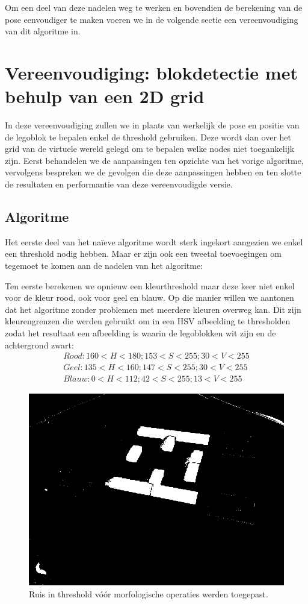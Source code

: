 Om een deel van deze nadelen weg te werken en bovendien de berekening van de pose eenvoudiger te maken voeren we in de volgende sectie een vereenvoudiging van dit algoritme in.
 
\section{Vereenvoudiging: blokdetectie met behulp van een 2D grid} \label{sec:naive_vereenv}
In deze vereenvoudiging zullen we in plaats van werkelijk de pose en positie van de legoblok te bepalen enkel de threshold gebruiken. Deze wordt dan over het grid van de virtuele wereld gelegd om te bepalen welke nodes niet toegankelijk zijn. Eerst behandelen we de aanpassingen ten opzichte van het vorige algoritme, vervolgens bespreken we de gevolgen die deze aanpassingen hebben en ten slotte de resultaten en performantie van deze vereenvoudigde versie.

\subsection{Algoritme}
Het eerste deel van het na\"ieve algoritme wordt sterk ingekort aangezien we enkel een threshold nodig hebben. Maar er zijn ook een tweetal toevoegingen om tegemoet te komen aan de nadelen van het algoritme:

Ten eerste berekenen we opnieuw een kleurthreshold maar deze keer niet enkel voor de kleur rood, ook voor geel en blauw. Op die manier  willen we aantonen dat het algoritme zonder problemen met meerdere kleuren overweg kan. Dit zijn kleurengrenzen die werden gebruikt om in een HSV afbeelding te thresholden zodat het resultaat een afbeelding is waarin de legoblokken wit zijn en de achtergrond zwart:
\begin{align*}
Rood: 160 < H < 180; 153 < S < 255; 30 < V < 255 \\
Geel: 135 < H < 160; 147 < S < 255; 30 < V < 255 \\
Blauw: 0 < H < 112; 42 < S < 255; 13 < V < 255
\end{align*}

\begin{figure}
  \centering
  \includegraphics[width=0.5\linewidth]{img/alg2Noise}
  \caption{Ruis in threshold v\'o\'or morfologische operaties werden toegepast.}
  \label{fig:algo2_noise}
\end{figure}

